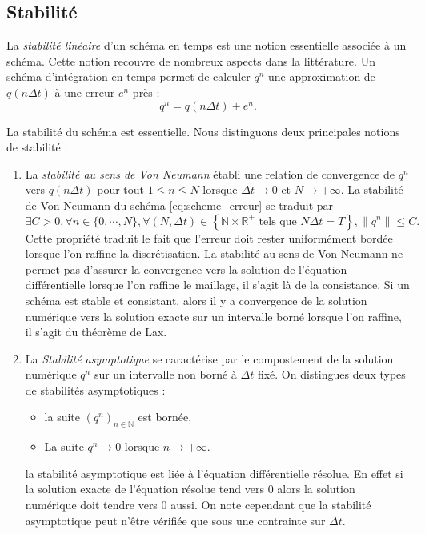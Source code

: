 \subsection{Stabilité}

La \textit{stabilité linéaire} d'un schéma en temps est une notion essentielle associée à un schéma. Cette notion recouvre de nombreux aspects dans la littérature.
Un schéma d'intégration en temps permet de calculer $q^n$ une approximation de $q(n \Delta t)$ à une erreur $e^n$ près :
\begin{equation}
q^n = q(n \Delta t) + e^n.
\label{eq:scheme_erreur}
\end{equation}

La stabilité du schéma est essentielle. Nous distinguons deux principales notions de stabilité :
\begin{enumerate}
\item La \textit{stabilité au sens de Von Neumann} établi une relation de convergence de $q^n$ vers $q(n \Delta t)$ pour tout $1 \leq n \leq N$ lorsque $\Delta t \rightarrow 0$ et $N \rightarrow + \infty$. 
La stabilité de Von Neumann du schéma \eqref{eq:scheme_erreur} se traduit par
\begin{equation}
\exists C >0, \forall n \in \{ 0 , \cdots , N \}, \forall (N, \Delta t) \in \left\lbrace \mathbb{N} \times \mathbb{R}^+ \text{ tels que } N \Delta t = T \right\rbrace, \| q^n \| \leq C.
\end{equation}
Cette propriété traduit le fait que l'erreur doit rester uniformément bordée lorsque l'on raffine la discrétisation. La stabilité au sens de Von Neumann ne permet pas d'assurer la convergence vers la solution de l'équation différentielle lorsque l'on raffine le maillage, il s'agit là de la consistance. Si un schéma est stable et consistant, alors il y a convergence de la solution numérique vers la solution exacte sur un intervalle borné lorsque l'on raffine, il s'agit du théorème de Lax.

\item La \textit{Stabilité asymptotique} se caractérise par le compostement de la solution numérique $q^n$ sur un intervalle non borné à $\Delta t$ fixé. On distingues deux types de stabilités asymptotiques :
\begin{itemize}
\item la suite $(q^n)_{n \in \mathbb{N}}$ est bornée,
\item La suite $q^n \rightarrow 0$ lorsque $n \rightarrow + \infty$.
\end{itemize}
la stabilité asymptotique est liée à l'équation différentielle résolue. En effet si la solution exacte de l'équation résolue tend vers $0$ alors la solution numérique doit tendre vers $0$ aussi. On note cependant que la stabilité asymptotique peut n'être vérifiée que sous une contrainte sur $\Delta t$.
\end{enumerate} 

